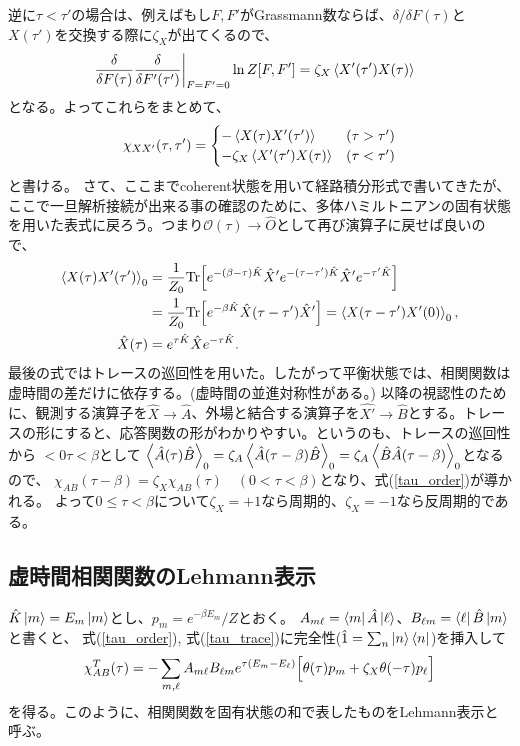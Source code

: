 \documentclass[a4paper,12pt]{jsarticle}
\begin{document}
逆に$\tau<\tau'$の場合は、例えばもし$F, F'$がGrassmann数ならば、$\delta/\delta F(\tau)$と$X(\tau')$を交換する際に$\zeta_X$が出てくるので、
\begin{align}
  &\left.\frac{\delta}{\delta F(\tau)}\frac{\delta}{\delta F'(\tau')}\right|_{F=F'=0}\ln Z[F, F'] = \zeta_X \ev{X'(\tau')X(\tau)}
\end{align}
となる。よってこれらをまとめて、
\begin{align}
  \chi_{XX'}(\tau,\tau') = \begin{cases}
    -\ev{X(\tau)X'(\tau')} & (\tau > \tau')\\
    -\zeta_X \ev{X'(\tau')X(\tau)} & (\tau < \tau')
  \end{cases}\label{tau_order}
\end{align}
と書ける。
さて、ここまでcoherent状態を用いて経路積分形式で書いてきたが、ここで一旦解析接続が出来る事の確認のために、多体ハミルトニアンの固有状態を用いた表式に戻ろう。つまり$\mathcal{O}(\tau)\rightarrow \hat{O}$として再び演算子に戻せば良いので、
\begin{align}
  \ev{X(\tau)X'(\tau')}_0
  &=\frac{1}{Z_0}\mathrm{Tr}\Bigl[
     e^{-(\beta-\tau)\hat K}\hat X'
     e^{-(\tau-\tau')\hat K}\hat X' e^{-\tau'\hat K}\Bigr]\\
  &=\frac{1}{Z_0}\mathrm{Tr}\Bigl[
     e^{-\beta\hat K}\hat X(\tau-\tau')\hat X'\Bigr] = \ev{X(\tau-\tau')X'(0)}_0,\label{tau_trace}\\
  \hat X(\tau)&=e^{\tau\hat K}\hat X e^{-\tau\hat K}.
\end{align}
最後の式ではトレースの巡回性を用いた。したがって平衡状態では、相関関数は虚時間の差だけに依存する。(虚時間の並進対称性がある。)
以降の視認性のために、観測する演算子を$\hat{X} \rightarrow \hat A$、外場と結合する演算子を$\hat{X'} \rightarrow \hat B$とする。トレースの形にすると、応答関数の形がわかりやすい。というのも、トレースの巡回性から $<0\tau<\beta$として
$\ev{\hat A(\tau)\hat B}_0 = \zeta_A \ev{\hat A(\tau-\beta)\hat B}_0 = \zeta_A \ev{\hat B\hat A(\tau-\beta)}_0$となるので、
$\chi_{AB}(\tau-\beta)=\zeta_X\chi_{AB}(\tau) \quad (0<\tau<\beta)$となり、式(\ref{tau_order})が導かれる。
よって$0\leq\tau<\beta$について$\zeta_X=+1$なら周期的、$\zeta_X=-1$なら反周期的である。

\subsection{虚時間相関関数のLehmann表示}
$\hat K\ket{m}=E_m\ket{m}$とし、$p_m=e^{-\beta E_m}/Z$とおく。
$A_{m\ell}=\bra m\hat A\ket\ell$、$B_{\ell m}=\bra\ell\hat B\ket m$と書くと、
式(\ref{tau_order}), 式(\ref{tau_trace})に完全性($\hat{1} = \sum_n\ket{n}\bra{n}$)を挿入して
\begin{align}
  \chi^T_{AB}(\tau)
  =-\sum_{m,\ell} A_{m\ell}B_{\ell m}e^{\tau(E_m-E_\ell)}
     \Bigl[\theta(\tau)p_m+\zeta_X\theta(-\tau)p_\ell\Bigr]
\end{align}
を得る。このように、相関関数を固有状態の和で表したものをLehmann表示と呼ぶ。
\end{document}
